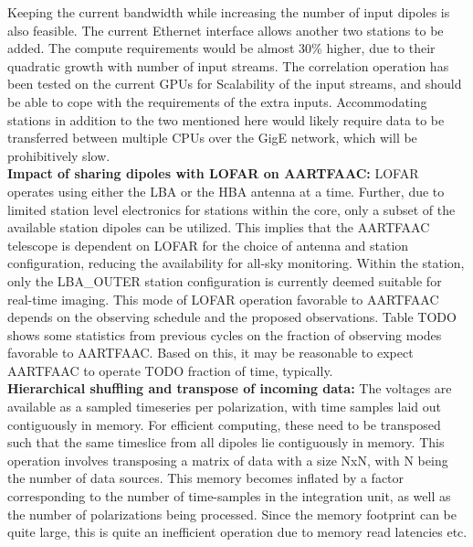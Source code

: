 \documentclass{ws-jai}
\begin{document}
Keeping the  current bandwidth while increasing  the number of input  dipoles is
also feasible. The current Ethernet interface  allows another two stations to be
added.   The compute  requirements would  be almost  30\% higher,  due to  their
quadratic growth  with number of  input streams.  The correlation  operation has
been tested on the current GPUs for Scalability of the input streams, and should
be  able to  cope  with the  requirements of  the  extra inputs.   Accommodating
stations in addition to  the two mentioned here would likely  require data to be
transferred  between  multiple  CPUs  over  the  GigE  network,  which  will  be
prohibitively slow.\\

\noindent  \textbf {Impact  of sharing  dipoles with  LOFAR on  AARTFAAC:} LOFAR
operates using  either the LBA  or the  HBA antenna at  a time. Further,  due to
limited station level electronics for stations within the core, only a subset of
the available  station dipoles can be  utilized. This implies that  the AARTFAAC
telescope  is  dependent  on  LOFAR  for  the  choice  of  antenna  and  station
configuration,  reducing the  availability  for all-sky  monitoring. Within  the
station, only the LBA\_OUTER station  configuration is currently deemed suitable
for  real-time imaging.   This mode  of  LOFAR operation  favorable to  AARTFAAC
depends on  the observing  schedule and the  proposed observations.   Table TODO
shows some  statistics from previous cycles  on the fraction of  observing modes
favorable to AARTFAAC. Based on this, it may be reasonable to expect AARTFAAC to
operate TODO fraction of time, typically.\\

\noindent \textbf {Hierarchical  shuffling and transpose of  incoming data:} The
voltages  are available  as a  sampled  timeseries per  polarization, with  time
samples laid out contiguously in memory.  For efficient computing, these need to
be transposed such that the same  timeslice from all dipoles lie contiguously in
memory. This  operation involves transposing a  matrix of data with  a size NxN,
with N  being the  number of data  sources.  This memory  becomes inflated  by a
factor corresponding to  the number of time-samples in the  integration unit, as
well as the number of polarizations  being processed. Since the memory footprint
can be quite  large, this is quite  an inefficient operation due  to memory read
latencies etc.\\
\end{document}
